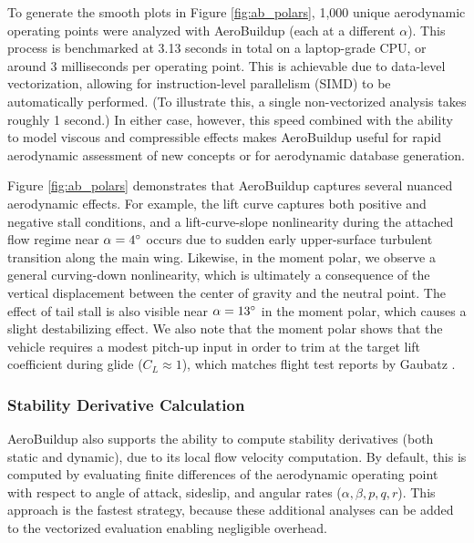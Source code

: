 To generate the smooth plots in Figure \ref{fig:ab_polars}, 1,000 unique aerodynamic operating points were analyzed with AeroBuildup (each at a different $\alpha$). This process is benchmarked at 3.13 seconds in total on a laptop-grade CPU, or around 3 milliseconds per operating point. This is achievable due to data-level vectorization, allowing for instruction-level parallelism (SIMD) to be automatically performed. (To illustrate this, a single non-vectorized analysis takes roughly 1 second.) In either case, however, this speed combined with the ability to model viscous and compressible effects makes AeroBuildup useful for rapid aerodynamic assessment of new concepts or for aerodynamic database generation.

Figure \ref{fig:ab_polars} demonstrates that AeroBuildup captures several nuanced aerodynamic effects. For example, the lift curve captures both positive and negative stall conditions, and a lift-curve-slope nonlinearity during the attached flow regime near $\alpha=4\degree$ occurs due to sudden early upper-surface turbulent transition along the main wing. Likewise, in the moment polar, we observe a general curving-down nonlinearity, which is ultimately a consequence of the vertical displacement between the center of gravity and the neutral point. The effect of tail stall is also visible near $\alpha=13\degree$ in the moment polar, which causes a slight destabilizing effect. We also note that the moment polar shows that the vehicle requires a modest pitch-up input in order to trim at the target lift coefficient during glide ($C_L\approx 1$), which matches flight test reports by Gaubatz \cite{gaubatz_design_2024}.

\subsubsection{Stability Derivative Calculation}

AeroBuildup also supports the ability to compute stability derivatives (both static and dynamic), due to its local flow velocity computation. By default, this is computed by evaluating finite differences of the aerodynamic operating point with respect to angle of attack, sideslip, and angular rates ($\alpha, \beta, p, q, r$). This approach is the fastest strategy, because these additional analyses can be added to the vectorized evaluation enabling negligible overhead.

